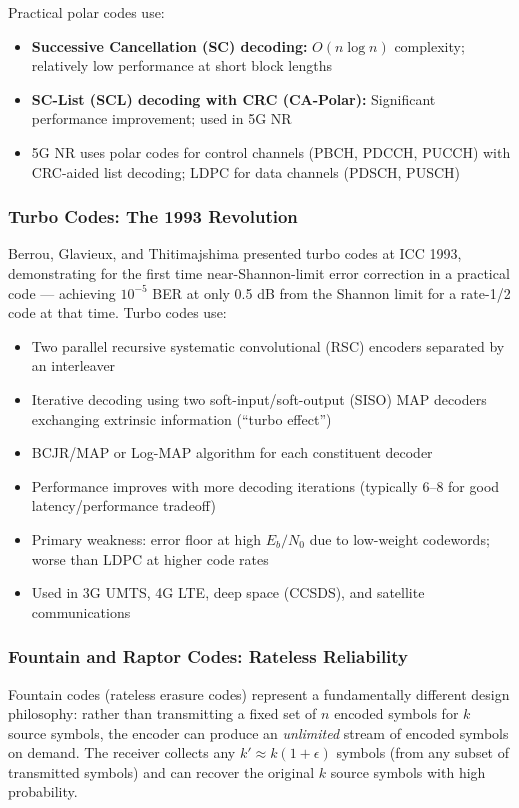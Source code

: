 \documentclass[11pt,letterpaper]{article}
\begin{document}
Practical polar codes use:
\begin{itemize}[leftmargin=*]
  \item \textbf{Successive Cancellation (SC) decoding:} $O(n \log n)$ complexity; relatively low performance at short block lengths
  \item \textbf{SC-List (SCL) decoding with CRC (CA-Polar):} Significant performance improvement; used in 5G NR
  \item 5G NR uses polar codes for control channels (PBCH, PDCCH, PUCCH) with CRC-aided list decoding; LDPC for data channels (PDSCH, PUSCH)
\end{itemize}

\subsubsection{Turbo Codes: The 1993 Revolution}

Berrou, Glavieux, and Thitimajshima presented turbo codes at ICC 1993, demonstrating for the first time near-Shannon-limit error correction in a practical code --- achieving $10^{-5}$ BER at only 0.5 dB from the Shannon limit for a rate-1/2 code at that time. Turbo codes use:
\begin{itemize}[leftmargin=*]
  \item Two parallel recursive systematic convolutional (RSC) encoders separated by an interleaver
  \item Iterative decoding using two soft-input/soft-output (SISO) MAP decoders exchanging extrinsic information (``turbo effect'')
  \item BCJR/MAP or Log-MAP algorithm for each constituent decoder
  \item Performance improves with more decoding iterations (typically 6--8 for good latency/performance tradeoff)
  \item Primary weakness: error floor at high $E_b/N_0$ due to low-weight codewords; worse than LDPC at higher code rates
  \item Used in 3G UMTS, 4G LTE, deep space (CCSDS), and satellite communications
\end{itemize}

\subsubsection{Fountain and Raptor Codes: Rateless Reliability}

Fountain codes (rateless erasure codes) represent a fundamentally different design philosophy: rather than transmitting a fixed set of $n$ encoded symbols for $k$ source symbols, the encoder can produce an \textit{unlimited} stream of encoded symbols on demand. The receiver collects any $k' \approx k(1+\epsilon)$ symbols (from any subset of transmitted symbols) and can recover the original $k$ source symbols with high probability.
\end{document}
